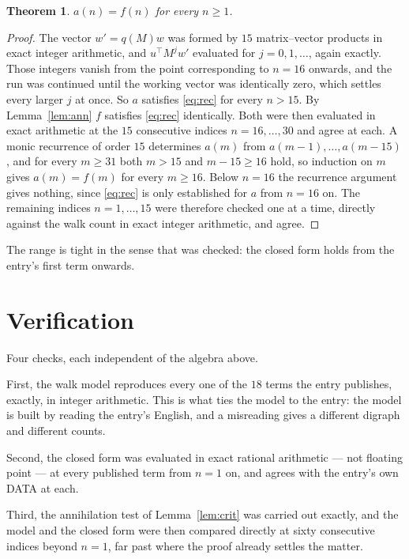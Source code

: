 \documentclass[11pt,a4paper]{article}
\theoremstyle{plain}
\newtheorem{theorem}{Theorem}
\theoremstyle{definition}
\begin{document}
\begin{theorem}
$a(n)=f(n)$ for every $n\ge1$.
\end{theorem}

\begin{proof}
The vector $w'=q(M)w$ was formed by $15$ matrix--vector products in exact integer
arithmetic, and $u^{\!\top}M^{j}w'$ evaluated for $j=0,1,\dots$, again exactly. Those integers
vanish from the point corresponding to $n=16$ onwards, and the run was continued until the
working vector was identically zero, which settles every larger $j$ at once. So $a$ satisfies
\eqref{eq:rec} for every $n>15$. By Lemma~\ref{lem:ann} $f$ satisfies \eqref{eq:rec}
identically. Both were then evaluated in exact arithmetic at the $15$ consecutive indices
$n=16,\dots,30$ and agree at each. A monic recurrence of order $15$
determines $a(m)$ from $a(m-1),\dots,a(m-15)$, and for every $m\ge31$ both
$m>15$ and $m-15\ge16$ hold, so induction on $m$ gives $a(m)=f(m)$ for every
$m\ge16$.
Below $n=16$ the recurrence argument gives nothing, since \eqref{eq:rec} is only
established for $a$ from $n=16$ on. The remaining indices $n=1,\dots,15$ were
therefore checked one at a time, directly against the walk count in exact integer arithmetic,
and agree.
\end{proof}

The range is tight in the sense that was checked: the closed form holds from the entry's first term onwards.

\section{Verification}

Four checks, each independent of the algebra above.

First, the walk model reproduces every one of the $18$ terms the entry publishes,
exactly, in integer arithmetic. This is what ties the model to the entry: the model is built
by reading the entry's English, and a misreading gives a different digraph and different
counts.

Second, the closed form was evaluated in exact rational arithmetic --- not floating point ---
at every published term from $n=1$ on, and agrees with the entry's own DATA at each.

Third, the annihilation test of Lemma~\ref{lem:crit} was carried out exactly, and the model
and the closed form were then compared directly at sixty consecutive indices beyond
$n=1$, far past where the proof already settles the matter.
\end{document}
